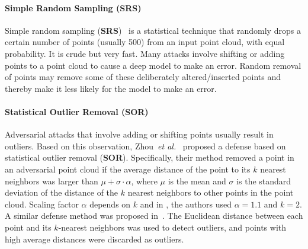 \documentclass{ieeeaccess}
\def\etal{\textit{et al.}}
\begin{document}
\paragraph{Simple Random Sampling (SRS)}
\label{sec:SRS}
Simple random sampling (\textbf{SRS})~\cite{xiang2019generating} is a statistical technique that randomly drops a certain number of points (usually 500) from an input point cloud, with equal probability. It is crude but very fast. Many attacks involve shifting or adding points to a point cloud to cause a deep model to make an error. Random removal of points may remove some of these deliberately altered/inserted points and thereby make it less likely for the model to make an error. %
% 

\paragraph{Statistical Outlier Removal (SOR)}
\label{sec:SOR}
Adversarial attacks that involve adding or shifting points usually result in outliers. %
Based on this observation, Zhou~\etal~\cite{zhou2019dup} proposed a defense based on statistical outlier removal (\textbf{SOR}). Specifically, their method  removed %
a point in an adversarial point cloud if the average distance of the point to its $k$ nearest neighbors was larger than %
$\mu + \sigma\cdot\alpha$, where $\mu$ is the mean and $\sigma$ is the standard deviation of the distance of the $k$ nearest neighbors to %
other points in the %
point cloud. Scaling factor $\alpha$ depends on $k$ and in \cite{zhou2019dup}, the authors used %
$\alpha = 1.1$ and $k=2$. %
A similar defense method was proposed in~\cite{zhou2018deflecting}. The Euclidean distance between each point and its $k$-nearest neighbors was used to detect outliers, and points with high average distances were discarded as outliers.
\end{document}
